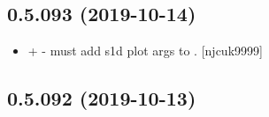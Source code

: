 \documentclass[a4paper,10pt,english]{report}
\begin{document}
\subsection{0.5.093 (2019-10-14)}
\label{\detokenize{misc/changelog:id49}}\begin{itemize}
\item {} 
 +
 - must add s1d plot args to
. {[}njcuk9999{]}

\end{itemize}


\subsection{0.5.092 (2019-10-13)}
\end{document}
